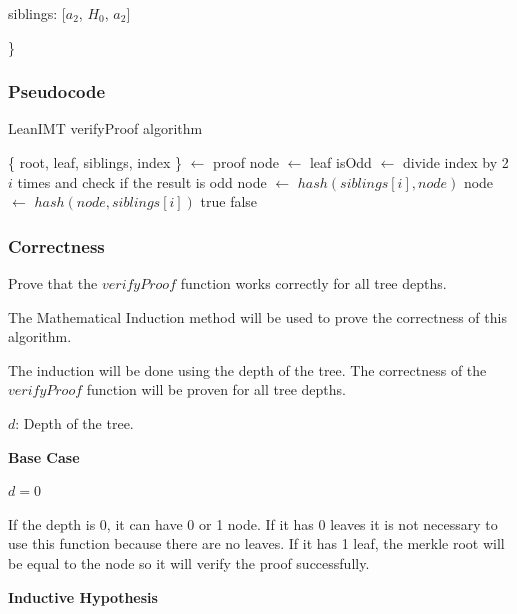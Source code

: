 \documentclass{article}
\begin{document}
siblings: [$a_2$, $H_0$, $a_2$]

\}


\subsubsection{Pseudocode}


\begin{algorithm}[H]
    \caption{LeanIMT verifyProof algorithm}\label{verifyProof}
    \begin{algorithmic}[1]
        \State \{ root, leaf, siblings, index \} $\gets$ proof 
        \State node $\gets$ leaf
        \State isOdd $\gets$ divide index by 2 $i$ times and check if the result is odd
         
        \State node $\gets$ $hash(siblings[i], node)$
        \Else {}
        \State node $\gets$ $hash(node, siblings[i])$
        \EndIf
        \EndFor
        \State \Return true
        \Else
        \State \Return false
        \EndIf
        \EndProcedure
    \end{algorithmic}
\end{algorithm}



\subsubsection{Correctness}

Prove that the $verifyProof$ function works correctly for all tree depths.

The Mathematical Induction method will be used to prove the correctness of this algorithm.

The induction will be done using the depth of the tree. The correctness of the $verifyProof$ function will be proven for all tree depths.

$d$: Depth of the tree.

\textbf{Base Case}

$d = 0$

If the depth is 0, it can have 0 or 1 node.
If it has 0 leaves it is not necessary to use this function because there are no leaves.
If it has 1 leaf, the merkle root will be equal to the node so it will verify the proof successfully.

\textbf{Inductive Hypothesis}
\end{document}
